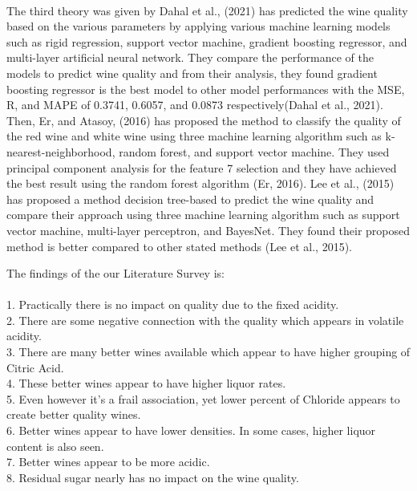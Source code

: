 \documentclass[a4paper, 12pt]{report}
\begin{document}
\\
\par The third theory was given by Dahal et al., (2021) has predicted the wine quality based on the various parameters by applying various machine learning models such as rigid regression, support vector machine, gradient boosting regressor, and multi-layer artificial neural network. They compare the performance of the models to predict wine quality and from their analysis, they found gradient boosting regressor is the best model to other model performances with the MSE, R, and MAPE of 0.3741, 0.6057, and 0.0873 respectively(Dahal et al., 2021). Then, Er, and Atasoy, (2016) has proposed the method to classify the quality of the red wine and white wine using three machine learning algorithm such as k-nearest-neighborhood, random forest, and support vector machine. They used principal component analysis for the feature 7 selection and they have achieved the best result using the random forest algorithm (Er, 2016). Lee et al., (2015) has proposed a method decision tree-based to predict the wine quality and compare their approach using three machine learning algorithm such as support vector machine, multi-layer perceptron, and BayesNet. They found their proposed method is better compared to other stated methods (Lee et al., 2015).
\\
\par The findings of the our Literature Survey is: \\
\\
1. Practically there is no impact on quality due to the fixed acidity. \\
2. There are some negative connection with the quality which appears in volatile acidity. \\
3. There are many better wines available which appear to have higher grouping of Citric Acid. \\
4. These better wines appear to have higher liquor rates. \\
5. Even however it's a frail association, yet lower percent of Chloride appears to create better quality wines. \\
6. Better wines appear to have lower densities. In some cases,  higher liquor content is also seen. \\
7. Better wines appear to be more acidic. \\
8. Residual sugar nearly has no impact on the wine quality. \\

\pagebreak
\end{document}
